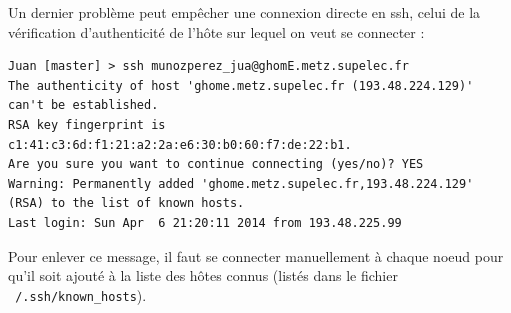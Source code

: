\par Un dernier problème peut empêcher une connexion directe en ssh, celui de la vérification d'authenticité de l'hôte sur lequel on veut se connecter : 
\begin{verbatim}
Juan [master] > ssh munozperez_jua@ghomE.metz.supelec.fr
The authenticity of host 'ghome.metz.supelec.fr (193.48.224.129)' 
can't be established.
RSA key fingerprint is c1:41:c3:6d:f1:21:a2:2a:e6:30:b0:60:f7:de:22:b1.
Are you sure you want to continue connecting (yes/no)? YES
Warning: Permanently added 'ghome.metz.supelec.fr,193.48.224.129' 
(RSA) to the list of known hosts.
Last login: Sun Apr  6 21:20:11 2014 from 193.48.225.99
\end{verbatim}

\par Pour enlever ce message, il faut se connecter manuellement à chaque noeud pour qu'il soit ajouté à la liste des hôtes connus (listés dans le fichier \texttt{~/.ssh/known\_hosts}).


